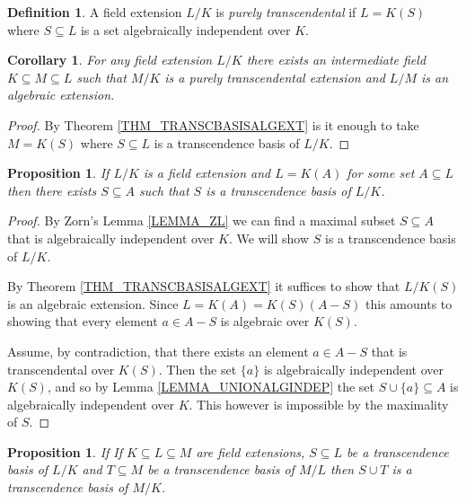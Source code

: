 \documentclass[12pt, letterpaper, oneside]{article}
\theoremstyle{plain}
\newtheorem{proposition}[theorem]{Proposition}
\newtheorem{corollary}[theorem]{Corollary}
\theoremstyle{definition}
\newtheorem{definition}[theorem]{Definition}
\newcommand{\vs}{\vskip 5mm}
\begin{document}
\vs\vs

\begin{definition}
A field extension $L/K$ is \emph{purely transcendental} if $L = K(S)$ where $S\subseteq L$ 
is a set algebraically independent over $K$. 
\end{definition}


\vs\vs

\begin{corollary}
\label{COR_FIELDEXTDECOMP}
For any field extension $L/K$ there exists an intermediate field $K\subseteq M\subseteq L$
such that $M/K$ is a purely transcendental extension and $L/M$ is an algebraic extension. 
\end{corollary}


\vs

\begin{proof}
By Theorem \ref{THM_TRANSCBASISALGEXT} is it enough to take $M = K(S)$ where 
$S\subseteq L$ is a transcendence basis of $L/K$. 
\end{proof}

\vs\vs

\begin{proposition}
If $L/K$ is a field extension and $L= K(A)$ for some set $A\subseteq L$ then  there
exists  $S\subseteq A$ such that $S$ is a transcendence basis of $L/K$.  
\end{proposition}

\vs 

\begin{proof}
By Zorn's Lemma \ref{LEMMA_ZL} we can find a maximal subset $S\subseteq A$ that is 
algebraically independent over $K$. We will show $S$ is a transcendence basis of $L/K$. 


By Theorem \ref{THM_TRANSCBASISALGEXT} it suffices to show that $L/K(S)$ is an 
algebraic extension. Since $L = K(A) = K(S)(A-S)$ this amounts to showing that every 
element $a\in A-S$ is algebraic over $K(S)$. 

Assume, by contradiction, that there exists an element $a\in A-S$ that is transcendental over $K(S)$. 
Then the set $\{a\}$ is algebraically independent over $K(S)$, and so by 
Lemma \ref{LEMMA_UNIONALGINDEP} the set $S\cup \{a\}\subseteq A$ is algebraically independent 
over $K$. This however is impossible  by the maximality of $S$.  
\end{proof}

\vs\vs

\begin{proposition}
\label{PROP_COMPTRANSCBASIS}
If If $K\subseteq L \subseteq M$ are field extensions,  
$S\subseteq L$ be a transcendence basis of $L/K$ and
$T\subseteq M$ be a transcendence basis of $M/L$ then $S\cup T$
is a transcendence basis of $M/K$.
\end{proposition}
\end{document}
